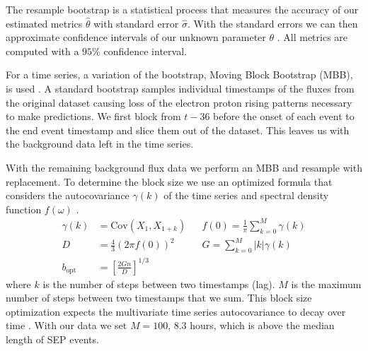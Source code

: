 The resample bootstrap is a statistical process that measures the accuracy of our estimated metrics $\hat{\theta}$ with standard error
 $\hat{\sigma}$.  With the standard errors we can then approximate confidence intervals of our unknown parameter $\theta$ \cite{Efron1986}. All metrics are computed with
 a $95 \%$ confidence interval.

For a time series, a variation of the bootstrap, Moving Block Bootstrap (MBB), is used \cite{kunsch1989jackknife}.
A standard bootstrap samples individual timestamps of the fluxes from the original dataset  causing loss of the electron proton rising patterns 
necessary to make predictions. We first block from $t-36$ before the onset of each event to the end event timestamp and slice them out of the dataset.
This leaves us with the background data left in the time series.

With the remaining background flux data we perform an MBB and resample with replacement. To determine the block size we use an optimized formula
that considers the autocovariance $\gamma(k)$ of the time series and spectral density function $f(\omega)$ \cite{bertail2024optimal}.
\begin{align}
    \gamma(k) &= \text{Cov}(X_1, X_{1+k})&& 
    f(0) = \frac{1}{\pi}\sum_{k = 0}^{M} \gamma(k) \\
    D &= \frac{4}{3}\left(2\pi f(0)\right)^2 &&
    G = \sum_{k=0}^{M} |k| \gamma(k) \\
    b_\text{opt} &= \left[ \frac{2Gn}{D} \right]^{1/3}
\end{align}
where $k$ is the number of steps between two timestamps (lag). $M$ is the maximum number of steps between two timestamps that we sum.
This block size optimization expects the multivariate time series autocovariance to decay over time \cite{bertail2024optimal}. With our data
we set $M = 100$, $8.3$ hours, which is above the median length of SEP events.

